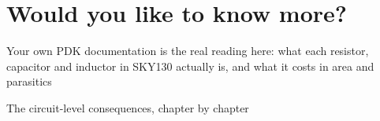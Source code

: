 \section{Would you like to know
more?}\label{would-you-like-to-know-more}

Your own PDK documentation is the real reading here: what each resistor,
capacitor and inductor in SKY130 actually is, and what it costs in area
and parasitics

The circuit-level consequences, chapter by chapter

\label{refs}
\begin{CSLReferences}{0}{0}
\CSLLeftMargin{{[}1{]} }%

\end{CSLReferences}
